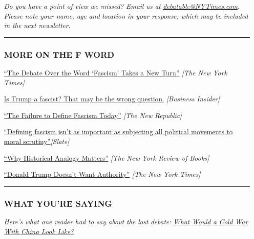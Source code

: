 \emph{Do you have a point of view we missed? Email us at}
\href{mailto:debatable@NYTimes.com}{\emph{debatable@NYTimes.com}}\emph{.
Please note your name, age and location in your response, which may be
included in the next newsletter.}

\begin{center}\rule{0.5\linewidth}{\linethickness}\end{center}

\hypertarget{more-on-the-f-word}{%
\subsubsection{MORE ON THE F WORD}\label{more-on-the-f-word}}

\href{https://www.nytimes3xbfgragh.onion/2020/06/10/books/fascism-debate-donald-trump.html}{``The
Debate Over the Word `Fascism' Takes a New Turn''} \emph{{[}The New York
Times{]}}

\href{https://www.businessinsider.com/is-trump-fascist-jason-stanley-says-it-is-wrong-question-2020-7}{Is
Trump a fascist? That may be the wrong question.} \emph{{[}Business
Insider{]}}

\href{https://newrepublic.com/article/154042/failure-define-fascism-today}{``The
Failure to Define Fascism Today''} \emph{{[}The New Republic{]}}

\href{https://slate.com/news-and-politics/2017/04/defining-fascism-isnt-as-important-as-subjecting-all-political-movements-to-moral-scrutiny.html}{``Defining
fascism isn't as important as subjecting all political movements to
moral scrutiny''}\emph{{[}Slate{]}}

\href{https://www.nybooks.com/daily/2020/01/07/why-historical-analogy-matters/}{``Why
Historical Analogy Matters''} \emph{{[}The New York Review of Books{]}}

\href{https://www.nytimes3xbfgragh.onion/2020/05/19/opinion/coronavirus-trump-orban.html}{``Donald
Trump Doesn't Want Authority''} \emph{{[}The New York Times{]}}

\begin{center}\rule{0.5\linewidth}{\linethickness}\end{center}

\hypertarget{what-youre-saying}{%
\subsubsection{WHAT YOU'RE SAYING}\label{what-youre-saying}}

\emph{Here's what one reader had to say about the last debate:}
\href{https://www.nytimes3xbfgragh.onion/2020/07/28/opinion/trump-china.html}{\emph{What
Would a Cold War With China Look Like?}}

